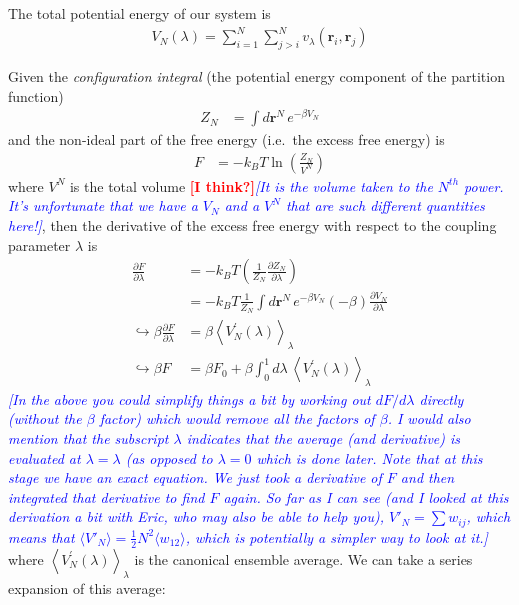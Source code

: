 \documentclass[letterpaper,twocolumn,amsmath,amssymb,prb]{revtex4-1}
\newcommand{\kT}{\ensuremath{k_BT}}
\newcommand{\1}{\ensuremath{\textbf{r}_1}}
\newcommand{\2}{\ensuremath{\textbf{r}_2}}
\newcommand{\3}{\ensuremath{\textbf{r}_3}}
\newcommand{\4}{\ensuremath{\textbf{r}_4}}
\newcommand{\fixme}[1]{\textcolor{red}{\textbf{[#1]}}}
\newcommand{\davidsays}[1]{\textcolor{blue}{\textit{[#1]}}}
\begin{document}
The total potential energy of our system is
\begin{align}
  V_N(\lambda) = \sum_{i=1}^N\sum_{j>i}^N v_\lambda(\mathbf{r}_i,\mathbf{r}_j)
  \label{eq:VN}
\end{align}

Given the \emph{configuration integral} (the potential energy component of the partition function)
\begin{align}
  Z_N &= \int d\mathbf{r}^N\, e^{-\beta V_N}
\end{align}
and the non-ideal part of the free energy (i.e.~the excess free energy) is
\begin{align}
  F &= -\kT\ln\left( \frac{Z_N}{V^N} \right)
\end{align}
where $V^N$ is the total volume \fixme{I think?}\davidsays{It is the
  volume taken to the $N^{th}$ power.  It's unfortunate that we have a
  $V_N$ and a $V^N$ that are such different quantities here!}, then
the derivative of the excess free energy with respect to the coupling
parameter $\lambda$ is
\begin{align}
  \frac{\partial F}{\partial\lambda} &= -\kT\left( \frac{1}{Z_N}\frac{\partial Z_N}{\partial\lambda} \right) \\
  &= -\kT\frac{1}{Z_N}\int d\mathbf{r}^N\, e^{-\beta V_N}(-\beta)\frac{\partial V_N}{\partial\lambda}
  \label{eqn:dFdlambda} \\
  \hookrightarrow \beta\frac{\partial F}{\partial\lambda} &= \beta\left\langle V_N^{'}(\lambda) \right\rangle_\lambda \\
  \hookrightarrow \beta F &= \beta F_0 + \beta\int_0^1 d\lambda\, \left\langle V_N^{'}(\lambda) \right\rangle_\lambda
\end{align}
\davidsays{In the above you could simplify things a bit by working out
$dF/d\lambda$ directly (without the $\beta$ factor) which would remove
all the factors of $\beta$.  I would also mention that the subscript
$\lambda$ indicates that the average (and derivative) is evaluated at
$\lambda = \lambda$ (as opposed to $\lambda=0$ which is done later.
Note that at this stage we have an exact equation.  We just took a
derivative of $F$ and then integrated that derivative to find $F$
again.  So far as I can see (and I looked at this derivation a bit
with Eric, who may also be able to help you), $V'_N = \sum w_{ij}$, which
means that $\langle V'_N\rangle = \frac12 N^2 \langle w_{12}
\rangle$, which is potentially a simpler way to look at it.}
where $\left\langle V_N^{'}(\lambda) \right\rangle_\lambda$ is the canonical ensemble average. We can take a series expansion of this average:
\end{document}
